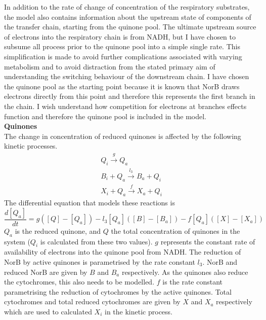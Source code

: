 In addition to the rate of change of concentration of the respiratory substrates, the model also contains information about the upstream state of components of the transfer chain, starting from the quinone pool. The ultimate upstream source of electrons into the respiratory chain is from NADH, but I have chosen to subsume all process prior to the quinone pool into a simple single rate. This simplification is made to avoid further complications associated with varying metabolism and to avoid distraction from the stated primary aim of understanding the switching behaviour of the downstream chain. I have chosen the quinone pool as the starting point because it is known that NorB draws electrons directly from this point and therefore this represents the first branch in the chain. I wish understand how competition for electrons at branches effects function and therefore the quinone pool is included in the model.\\
{\bf Quinones}\\
The change in concentration of reduced quinones is affected by the following kinetic processes.
\begin{equation*}
\begin{gathered}
Q_i \xrightarrow{g} Q_a\\
B_i + Q_a \xrightarrow{l_3} B_a + Q_i\\
X_i + Q_a \xrightarrow{f} X_a + Q_i
\end{gathered}
\end{equation*}
The differential equation that models these reactions is
\begin{equation}
\frac{d[Q_a]}{dt} = g([Q] - [Q_a]) - l_3[Q_a]([B] - [B_a]) - f[Q_a]([X]-[X_a])
\label{eq:quinones}
\end{equation}
$Q_a$ is the reduced quinone, and $Q$ the total concentration of quinones in the system ($Q_i$ is calculated from these two values). $g$ represents the constant rate of availability of electrons into the quinone pool from NADH. The reduction of NorB by active quinones is parametrised by the rate constant $l_3$. NorB and reduced NorB are given by $B$ and $B_a$ respectively. As the quinones also reduce the cytochromes, this also needs to be modelled. $f$ is the rate constant parametrising the reduction of cytochromes by the active quinones. Total cytochromes and total reduced cytochromes are given by $X$ and $X_a$ respectively which are used to calculated $X_i$ in the kinetic process.\\
